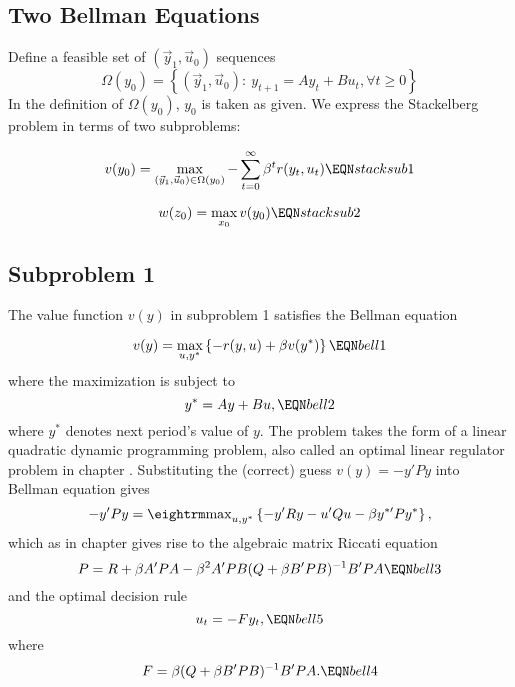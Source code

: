 \subsection{Two Bellman Equations}
Define a feasible set of $(\vec y_1, \vec u_0)$ sequences
   $$
   \Omega(y_0) = \left\{ (\vec y_1, \vec u_0) : \ y_{t+1} = A y_t + B u_t, \forall t \geq 0 \right\} $$
In the definition of $\Omega(y_0)$, $y_0$ is taken as given.
We  express the Stackelberg problem in terms of  two subproblems:

\medskip
{}

$$   v(y_0) = \max_{(\vec y_1, \vec u_0) \in \Omega(y_0)} - \sum_{t=0}^\infty \beta^t r(y_t, u_t)
   \EQN stacksub1  $$


\medskip
{}

$$
   w(z_0) = \max_{x_0} v(y_0) \EQN stacksub2 $$



\subsection{Subproblem 1}
The value function $v(y)$ in  subproblem 1 satisfies the Bellman equation

$$    v(y) = \max_{u, y^*} \left\{ - r(y,u) + \beta v(y^*) \right\} \EQN bell1
$$
where the maximization is subject to
$$     y^* = A y + B u,
  \EQN bell2 $$
where  $y^*$ denotes next period's value of $y$.
 The problem takes the form of a linear quadratic dynamic programming problem, also called  an optimal linear regulator problem in
  chapter .  Substituting the (correct) guess  $v(y) = - y'P y$ into  Bellman equation   gives
$$   - y' P y = {\rm max}_{  u, y^*} \left\{ -  y' R y -   u'Q     u - \beta y^{* \prime} P y^* \right\} , $$
which as in chapter  gives rise to the algebraic matrix Riccati equation
$$    P = R + \beta A' P A - \beta^2 A' P   B (  Q  + \beta   B' P   B)^{-1}   B' P A
    \EQN bell3 $$
and the optimal decision rule  %
$$    u_t = - F y_t,
  \EQN bell5 $$
where
$$   F = \beta(   Q + \beta   B' P   B)^{-1}  B' P A . \EQN bell4 $$


